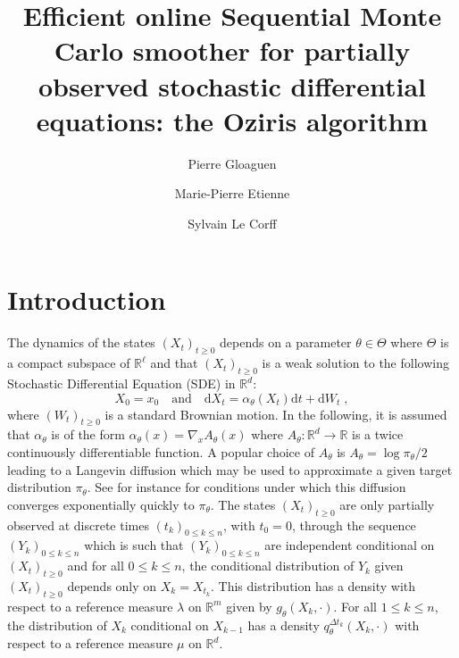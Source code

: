 \documentclass[12pt]{article}
\newcommand{\rmd}{\mathrm{d}}
\newcommand{\eqsp}{\;}
\newcommand{\1}{\mathrm{1}}
\begin{document}
\author{Pierre Gloaguen\footnotemark[1] \and Marie-Pierre Etienne\footnotemark[1] \and Sylvain Le {C}orff\footnotemark[2]}
 


\title{Efficient online Sequential Monte Carlo smoother for partially observed stochastic differential equations: the Oziris algorithm}


\maketitle


\section{Introduction}
The dynamics of the states $(X_t)_{t\ge 0}$ depends on a parameter $\theta\in \Theta$ where $\Theta$ is a compact subspace of $\mathbb{R}^{\ell}$ and that $(X_t)_{t\ge 0}$ is a weak solution to the following Stochastic Differential Equation (SDE) in $\mathbb{R}^d$:
\begin{equation}
\label{eq:target:sde}
X_0 = x_0\quad\mbox{and}\quad \rmd X_t = \alpha_{\theta}(X_t)\rmd t + \rmd W_t\eqsp,
\end{equation}
where $(W_t)_{t\ge 0}$ is a standard Brownian motion. In the following, it is assumed that $\alpha_{\theta}$ is of the form $\alpha_{\theta}(x) = \nabla_x A_{\theta}(x)$ where $A_{\theta}: \mathbb{R}^d \to \mathbb{R}$ is a twice continuously differentiable function. A popular choice of $A_{\theta}$  is $A_{\theta} = \log \pi_{\theta}/2$ leading to a Langevin diffusion which may be used to approximate a given target distribution $\pi_{\theta}$. See for instance \cite{roberts:tweedie:1996} for conditions under which this diffusion converges exponentially quickly to $\pi_{\theta}$. The states $(X_t)_{t\ge 0}$ are only partially observed at discrete times $(t_k)_{0\le k \le n}$, with $t_0=0$, through the sequence $(Y_k)_{0\le k\le n}$ which is such that $(Y_k)_{0\le k\le n}$ are independent conditional on $(X_t)_{t\ge 0}$ and for all $0\le k\le n$, the conditional distribution of $Y_k$ given $(X_t)_{t\ge 0}$ depends only on $X_k = X_{t_k}$. This distribution has a density with respect to a reference measure $\lambda$ on $\mathbb{R}^m$ given by $g_{\theta}(X_k,\cdot)$. For all $1\le k \le n$, the distribution of $X_{k} $ conditional on $X_{k-1}$ has a density $q^{\Delta t_k}_{\theta}(X_k,\cdot)$ with respect to a reference measure $\mu$ on $\mathbb{R}^d$.
\end{document}

